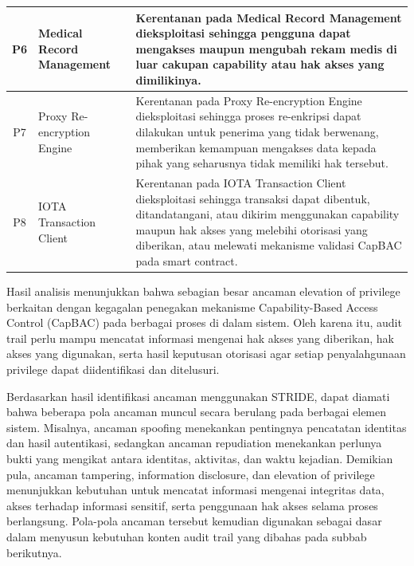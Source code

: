 \begin{xltabular}{\textwidth}{|c|>{\raggedright\arraybackslash}p{3.2cm}|X|}
    P6 &
    Medical Record Management &
    Kerentanan pada Medical Record Management dieksploitasi sehingga pengguna dapat mengakses maupun mengubah rekam medis di luar cakupan capability atau hak akses yang dimilikinya. \\
    \hline

    P7 &
    Proxy Re-encryption Engine &
    Kerentanan pada Proxy Re-encryption Engine dieksploitasi sehingga proses re-enkripsi dapat dilakukan untuk penerima yang tidak berwenang, memberikan kemampuan mengakses data kepada pihak yang seharusnya tidak memiliki hak tersebut. \\
    \hline

    P8 &
    IOTA Transaction Client &
    Kerentanan pada IOTA Transaction Client dieksploitasi sehingga transaksi dapat dibentuk, ditandatangani, atau dikirim menggunakan capability maupun hak akses yang melebihi otorisasi yang diberikan, atau melewati mekanisme validasi CapBAC pada smart contract. \\
    \hline

\end{xltabular}

Hasil analisis menunjukkan bahwa sebagian besar ancaman elevation of privilege berkaitan dengan kegagalan penegakan mekanisme Capability-Based Access Control (CapBAC) pada berbagai proses di dalam sistem. Oleh karena itu, audit trail perlu mampu mencatat informasi mengenai hak akses yang diberikan, hak akses yang digunakan, serta hasil keputusan otorisasi agar setiap penyalahgunaan privilege dapat diidentifikasi dan ditelusuri.

Berdasarkan hasil identifikasi ancaman menggunakan STRIDE, dapat diamati bahwa beberapa pola ancaman muncul secara berulang pada berbagai elemen sistem. Misalnya, ancaman spoofing menekankan pentingnya pencatatan identitas dan hasil autentikasi, sedangkan ancaman repudiation menekankan perlunya bukti yang mengikat antara identitas, aktivitas, dan waktu kejadian. Demikian pula, ancaman tampering, information disclosure, dan elevation of privilege menunjukkan kebutuhan untuk mencatat informasi mengenai integritas data, akses terhadap informasi sensitif, serta penggunaan hak akses selama proses berlangsung. Pola-pola ancaman tersebut kemudian digunakan sebagai dasar dalam menyusun kebutuhan konten audit trail yang dibahas pada subbab berikutnya.